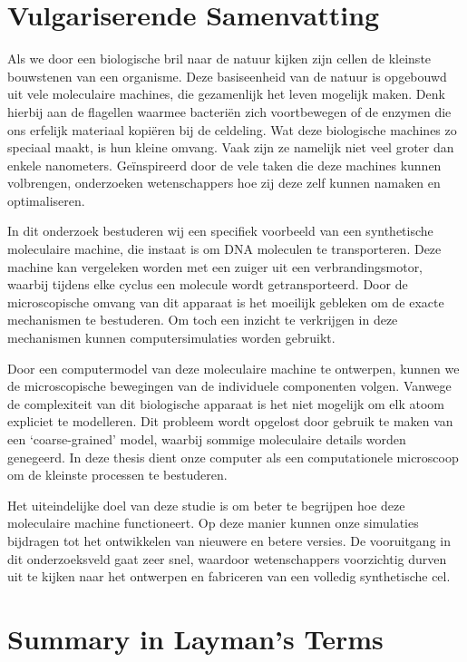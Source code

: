 \chapter*{Vulgariserende Samenvatting}

Als we door een biologische bril naar de natuur kijken zijn cellen de kleinste bouwstenen
van een organisme. Deze basiseenheid van de natuur is opgebouwd uit vele moleculaire
machines, die gezamenlijk het leven mogelijk maken. Denk hierbij aan de flagellen waarmee
bacteriën zich voortbewegen of de enzymen die ons erfelijk materiaal kopiëren bij de
celdeling. Wat deze biologische machines zo speciaal maakt, is hun kleine omvang. Vaak
zijn ze namelijk
niet veel groter dan enkele nanometers. Geïnspireerd door de vele taken die deze machines
kunnen volbrengen, onderzoeken wetenschappers hoe zij deze zelf kunnen namaken en
optimaliseren.

In dit onderzoek bestuderen wij een specifiek voorbeeld van een synthetische moleculaire
machine, die instaat is om DNA moleculen te transporteren. Deze machine kan vergeleken
worden met een zuiger uit een verbrandingsmotor, waarbij tijdens elke cyclus een molecule
wordt getransporteerd. Door de microscopische omvang van dit apparaat is het moeilijk
gebleken om de exacte mechanismen te bestuderen. Om toch een inzicht te verkrijgen in
deze
mechanismen kunnen computersimulaties worden gebruikt.

Door een computermodel van deze moleculaire machine te ontwerpen, kunnen we de
microscopische bewegingen van de individuele componenten volgen. Vanwege de complexiteit
van dit biologische apparaat is het niet mogelijk om elk atoom expliciet te modelleren.
Dit probleem wordt opgelost door gebruik te maken van een ‘coarse-grained’ model, waarbij
sommige moleculaire details worden genegeerd. In deze thesis dient onze computer als een
computationele microscoop om de kleinste processen te bestuderen.

Het uiteindelijke doel van deze studie is om beter te begrijpen hoe deze moleculaire
machine functioneert. Op deze manier kunnen onze simulaties bijdragen tot het ontwikkelen
van
nieuwere en betere versies.  De
vooruitgang in dit onderzoeksveld gaat zeer snel, waardoor wetenschappers voorzichtig
durven uit te kijken naar het ontwerpen en fabriceren van een volledig synthetische cel.


\cleardoublepage
{}
\chapter*{Summary in Layman's Terms}

